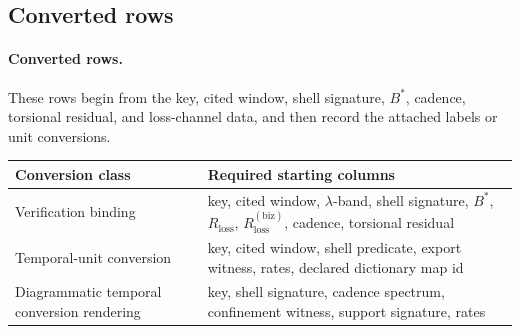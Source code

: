 \subsection{Converted rows}\label{app:realworld-routing}
\paragraph{Converted rows.} These rows begin from the key, cited window, shell signature, $B^*$, cadence, torsional residual, and loss-channel data, and then record the attached labels or unit conversions.

\begin{center}
\begin{tabularx}{\linewidth}{@{}lX@{}}
\toprule
Conversion class & Required starting columns \\
\midrule
Verification binding & key, cited window, $\lambda$-band, shell signature, $B^*$, $R_{\mathrm{loss}}$, $R^{(\mathrm{biz})}_{\mathrm{loss}}$, cadence, torsional residual \\
Temporal-unit conversion & key, cited window, shell predicate, export witness, rates, declared dictionary map id \\
Diagrammatic temporal conversion rendering & key, shell signature, cadence spectrum, confinement witness, support signature, rates \\
\bottomrule
\end{tabularx}
\end{center}
